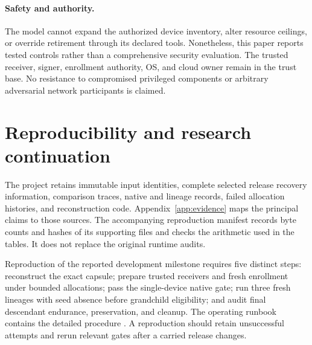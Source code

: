 \documentclass[11pt,letterpaper]{article}
\begin{document}
\paragraph{Safety and authority.}
The model cannot expand the authorized device inventory, alter resource
ceilings, or override retirement through its declared tools. Nonetheless,
this paper reports tested controls rather than a comprehensive security
evaluation. The trusted receiver, signer, enrollment authority, OS, and cloud
owner remain in the trust base. No resistance to compromised privileged
components or arbitrary adversarial network participants is claimed.

\section{Reproducibility and research continuation}

The project retains immutable input identities, complete selected release
recovery information, comparison traces, native and lineage records, failed
allocation histories, and reconstruction code. Appendix~\ref{app:evidence}
maps the principal claims to those sources. The accompanying reproduction
manifest records byte counts and hashes of its supporting files and
checks the arithmetic used in the tables. It does not replace the original
runtime audits.

Reproduction of the reported development milestone requires five distinct
steps: reconstruct the exact capsule; prepare trusted receivers and fresh
enrollment under bounded allocations; pass the single-device native gate;
run three fresh lineages with seed absence before grandchild eligibility;
and audit final descendant endurance, preservation, and cleanup. The operating
runbook contains the detailed procedure \cite{operations}. A reproduction
should retain unsuccessful attempts and rerun relevant gates after a carried
release changes.
\end{document}
